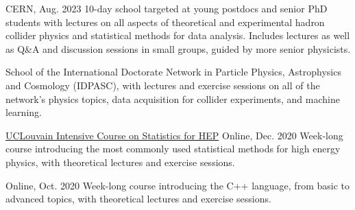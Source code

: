 
\begin{cventries}
    {}{CERN, Aug. 2023}
    {10-day school targeted at young postdocs and senior PhD students with lectures on all aspects of theoretical and experimental hadron collider physics and statistical methods for data analysis. Includes lectures as well as Q\&A and discussion sessions in small groups, guided by more senior physicists.}\vspace*{2mm}

    {School of the International Doctorate Network in Particle Physics, Astrophysics and Cosmology (IDPASC), with lectures and exercise sessions on all of the network's physics topics, data acquisition for collider experiments, and machine learning.}
    
    \cventry
    {\href{https://agenda.irmp.ucl.ac.be/event/4097/}{UCLouvain Intensive Course on Statistics for HEP}}{}
    {}{Online, Dec. 2020}
    {Week-long course introducing the most commonly used statistical methods for high energy physics, with theoretical lectures and exercise sessions.}\vspace*{2mm}
    
    {}{Online, Oct. 2020}
    {Week-long course introducing the C++ language, from basic to advanced topics, with theoretical lectures and exercise sessions.}\vspace*{2mm}
        




\end{cventries}

